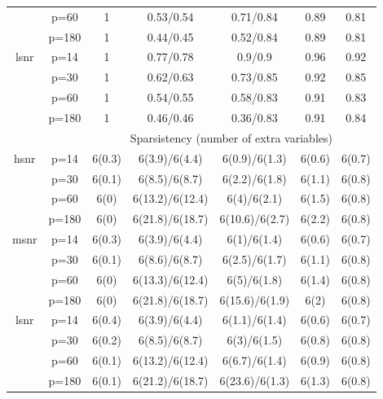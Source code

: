 \begin{table}[ht]
{\begin{tabular}{|c|c|ccccc|}
   & p=60 & 1 & 0.53/0.54 & 0.71/0.84 & 0.89 & 0.81 \\ 
   & p=180 & 1 & 0.44/0.45 & 0.52/0.84 & 0.89 & 0.81 \\ 
  \midrule\multirow{4}[2]{*}{lsnr} & p=14 & 1 & 0.77/0.78 & 0.9/0.9 & 0.96 & 0.92 \\ 
   & p=30 & 1 & 0.62/0.63 & 0.73/0.85 & 0.92 & 0.85 \\ 
   & p=60 & 1 & 0.54/0.55 & 0.58/0.83 & 0.91 & 0.83 \\ 
   & p=180 & 1 & 0.46/0.46 & 0.36/0.83 & 0.91 & 0.84 \\ 
   \midrule 
 \multicolumn{1}{|c}{} &       & \multicolumn{5}{c|}{Sparsistency (number of extra variables)} \\
\midrule\multirow{4}[2]{*}{hsnr} & p=14 & 6(0.3) & 6(3.9)/6(4.4) & 6(0.9)/6(1.3) & 6(0.6) & 6(0.7) \\ 
   & p=30 & 6(0.1) & 6(8.5)/6(8.7) & 6(2.2)/6(1.8) & 6(1.1) & 6(0.8) \\ 
   & p=60 & 6(0) & 6(13.2)/6(12.4) & 6(4)/6(2.1) & 6(1.5) & 6(0.8) \\ 
   & p=180 & 6(0) & 6(21.8)/6(18.7) & 6(10.6)/6(2.7) & 6(2.2) & 6(0.8) \\ 
  \midrule\multirow{4}[2]{*}{msnr} & p=14 & 6(0.3) & 6(3.9)/6(4.4) & 6(1)/6(1.4) & 6(0.6) & 6(0.7) \\ 
   & p=30 & 6(0.1) & 6(8.6)/6(8.7) & 6(2.5)/6(1.7) & 6(1.1) & 6(0.8) \\ 
   & p=60 & 6(0) & 6(13.3)/6(12.4) & 6(5)/6(1.8) & 6(1.4) & 6(0.8) \\ 
   & p=180 & 6(0) & 6(21.8)/6(18.7) & 6(15.6)/6(1.9) & 6(2) & 6(0.8) \\ 
  \midrule\multirow{4}[2]{*}{lsnr} & p=14 & 6(0.4) & 6(3.9)/6(4.4) & 6(1.1)/6(1.4) & 6(0.6) & 6(0.7) \\ 
   & p=30 & 6(0.2) & 6(8.5)/6(8.7) & 6(3)/6(1.5) & 6(0.8) & 6(0.8) \\ 
   & p=60 & 6(0.1) & 6(13.2)/6(12.4) & 6(6.7)/6(1.4) & 6(0.9) & 6(0.8) \\ 
   & p=180 & 6(0.1) & 6(21.2)/6(18.7) & 6(23.6)/6(1.3) & 6(1.3) & 6(0.8) \\ 
   \bottomrule 
\end{tabular}
}
\end{table}
